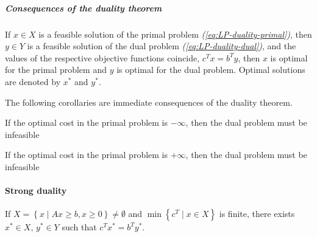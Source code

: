 \documentclass[english]{article}
\begin{document}
\subparagraph*{Consequences of the duality theorem}

If \(x \in X\) is a feasible solution of the primal problem \textit{(\ref{eq:LP-duality-primal})}, then \(y \in Y\) is a feasible solution of the dual problem \textit{(\ref{eq:LP-duality-dual})}, and the values of the respective objective functions coincide, \(c^T x = b^T y\), then \(x\) is optimal for the primal problem and \(y\) is optimal for the dual problem.
Optimal solutions are denoted by \(x^\ast\) and \(y^\ast\).

The following corollaries are immediate consequences of the duality theorem.

\begin{corollary}
  If the optimal cost in the primal problem is \(-\infty\), then the dual problem must be infeasible
\end{corollary}

\begin{corollary}
  If the optimal cost in the primal problem is \(+\infty\), then the dual problem must be infeasible
\end{corollary}

\paragraph{Strong duality}

\begin{theorem}
  If \(X = \left\{ x \mid Ax \geq b, x \geq 0 \right\} \neq \emptyset\) and \(\min\left\{ c^T \mid x \in X \right\}\) is finite, there exists \(x^\ast \in X, \, y^\ast \in Y\) such that \(c^T x^\ast = b^T y^\ast\).
\end{theorem}
\end{document}
